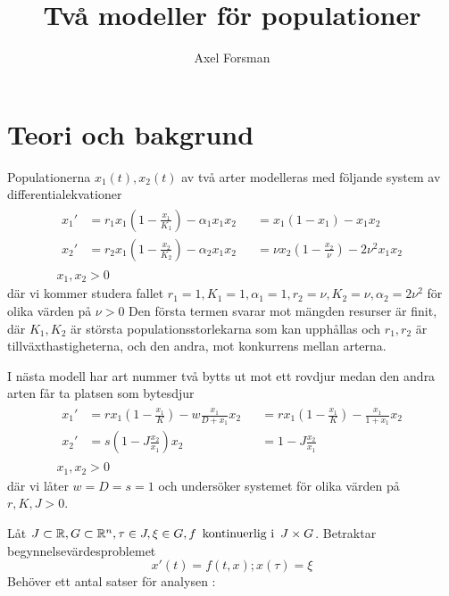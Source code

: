 \documentclass{article}
\title{Två modeller för populationer}
\author{Axel Forsman}
\begin{document}
\maketitle

\section{Teori och bakgrund}

Populationerna $x_1(t), x_2(t)$ av två arter modelleras med följande
system av differentialekvationer
\begin{equation}\label{eq:competition_model}
	\begin{gathered}
		\begin{alignedat}{3}
			x_1' &= r_1 x_1 (1-\frac{x_1}{K_1}) - \alpha_1 x_1 x_2 &&= x_1 (1-x_1) - x_1 x_2 \\
			x_2' &= r_2 x_1 (1-\frac {x_2}{K_2}) - \alpha_2 x_1 x_2 &&= \nu x_2 (1 - \frac{x_2}\nu) - 2\nu^2 x_1 x_2
		\end{alignedat} \\
		x_1, x_2 > 0
	\end{gathered}
\end{equation}
där vi kommer studera fallet
$r_1=1, K_1=1, \alpha_1=1, r_2=\nu, K_2=\nu, \alpha_2=2\nu^2$
för olika värden på $\nu>0$
Den första termen svarar mot mängden resurser är finit,
där $K_1,K_2$ är största populationsstorlekarna som kan upphållas
och $r_1,r_2$ är tillväxthastigheterna,
och den andra, mot konkurrens mellan arterna.

I nästa modell har art nummer två bytts ut mot ett rovdjur
medan den andra arten får ta platsen som bytesdjur
\begin{equation}\label{eq:predator_prey_model}
	\begin{gathered}
		\begin{alignedat}{3}
			x_1' &= r x_1 (1-\frac{x_1}K) - w \frac{x_1}{D + x_1} x_2 &&= r x_1 (1-\frac{x_1}K) - \frac{x_1}{1 + x_1} x_2 \\
			x_2' &= s \left(1 - J \frac{x_2}{x_1}\right) x_2 &&= 1 - J \frac{x_2}{x_1}
		\end{alignedat} \\
		x_1, x_2 > 0
	\end{gathered}
\end{equation}
där vi låter $w = D = s = 1$ och undersöker systemet för
olika värden på $r, K, J > 0$.

Låt $J \subset \mathbb R, G \subset \mathbb R^n, \tau \in J, \xi \in G, f \text{\, kontinuerlig i \,} J \times G$.
Betraktar begynnelsevärdesproblemet
\begin{equation}\label{eq:ivp}
	x'(t) = f(t, x); x(\tau) = \xi
\end{equation}
Behöver ett antal satser för analysen \autocite{lnotes}:
\end{document}
